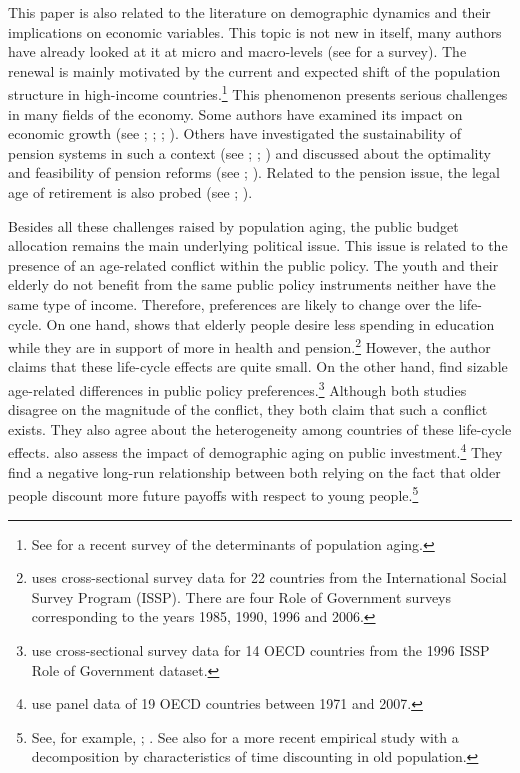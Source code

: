 This paper is also related to the literature on demographic dynamics and their implications on economic variables. This topic is not new in itself, many authors have already looked at it at micro and macro-levels (see \cite{Clark1978} for a survey). The renewal is mainly motivated by the current and expected shift of the population structure in high-income countries.\footnote{See \cite{Bloom2016} for a recent survey of the determinants of population aging.} This phenomenon presents serious challenges in many fields of the economy. Some authors have examined its impact on economic growth (see \cite{VanGroezen2005}; \cite{Soares2005}; \cite{Bloom2010}; \cite{Lee2010}). Others have investigated the sustainability of pension systems in such a context (see \cite{Ono2003}; \cite{DelaCroix2013}; \cite{Philipov2014}) and discussed about the optimality and feasibility of pension reforms (see \cite{Pecchenino1997}; \cite{Sinn2003}). Related to the pension issue, the legal age of retirement is also probed (see \cite{Futagami2001}; \cite{Dedry2017}).

Besides all these challenges raised by population aging, the public budget allocation remains the main underlying political issue. This issue is related to the presence of an age-related conflict within the public policy. The youth and their elderly do not benefit from the same public policy instruments neither have the same type of income. Therefore, preferences are likely to change over the life-cycle. On one hand, \cite{Sorensen2013} shows that elderly people desire less spending in education while they are in support of more in health and pension.\footnote{\cite{Sorensen2013} uses cross-sectional survey data for 22 countries from the International Social Survey Program (ISSP). There are four Role of Government surveys corresponding to the years 1985, 1990, 1996 and 2006.} However, the author claims that these life-cycle effects are quite small. On the other hand, \cite{Busemeyer2009} find sizable age-related differences in public policy preferences.\footnote{\cite{Busemeyer2009} use cross-sectional survey data for 14 OECD countries from the 1996 ISSP Role of Government dataset.} Although both studies disagree on the magnitude of the conflict, they both claim that such a conflict exists. They also agree about the heterogeneity among countries of these life-cycle effects. \cite{Jager2016} also assess the impact of demographic aging on public investment.\footnote{\cite{Jager2016} use panel data of 19 OECD countries between 1971 and 2007.} They find a negative long-run relationship between both relying on the fact that older people discount more future payoffs with respect to young people.\footnote{See, for example, \cite{Harrison2002}; \cite{Read2004}. See also \cite{Huffman2017} for a more recent empirical study with a decomposition by characteristics of time discounting in old population.}

